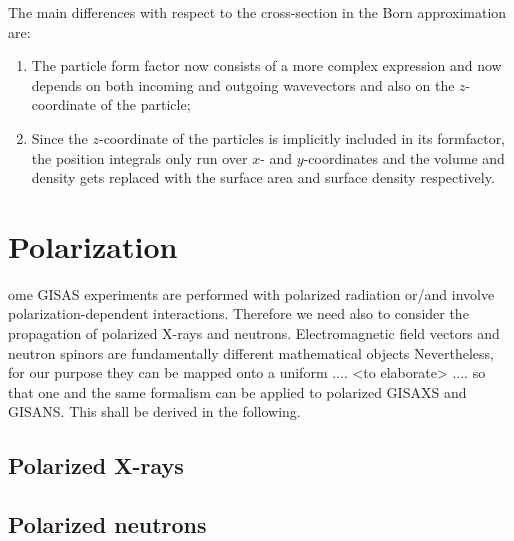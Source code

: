 The main differences with respect to the cross-section in the Born approximation are:
\begin{enumerate}
  \item The particle form factor now consists of a more complex expression and now depends on both incoming and outgoing wavevectors and also on the $z$-coordinate of the particle;
  \item Since the $z$-coordinate of the particles is implicitly included in its formfactor, the position integrals only run over $x$- and $y$-coordinates and the volume and density gets replaced with the surface area and surface density respectively.
\end{enumerate}

\section{Polarization}

ome GISAS experiments are performed with polarized radiation
or/and involve polarization-dependent interactions.
Therefore we need also to consider
the propagation of polarized X-rays and neutrons.
Electromagnetic field vectors and neutron spinors
are fundamentally different mathematical objects
Nevertheless, for our purpose they can be
mapped onto a uniform .... <to elaborate> ....
so that one and the same formalism can be applied
to polarized GISAXS and GISANS.
This shall be derived in the following.


\subsection{Polarized X-rays}

\subsection{Polarized neutrons}




